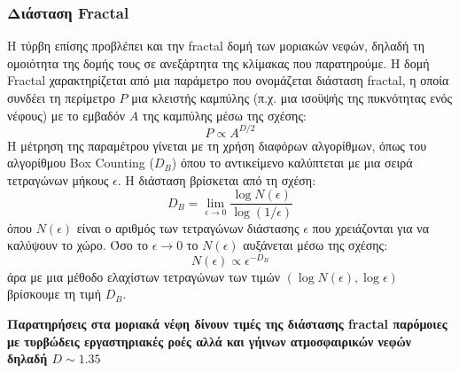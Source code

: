 \documentclass[a4paper,12pt]{memoir}
\begin{document}
\subsubsection{Διάσταση Fractal}
Η τύρβη επίσης προβλέπει και την fractal δομή των μοριακών νεφών, δηλαδή τη ομοιότητα της δομής τους σε ανεξάρτητα της κλίμακας που παρατηρούμε. 
Η δομή Fractal χαρακτηρίζεται από μια παράμετρο που ονομάζεται διάσταση fractal, η οποία συνδέει τη περίμετρο $P$ μια κλειστής καμπύλης (π.χ. μια ισοϋψής της πυκνότητας ενός νέφους) με το εμβαδόν $A$ της καμπύλης μέσω της σχέσης:
\begin{equation}
P\propto A^{D/2}
\end{equation}
Η μέτρηση της παραμέτρου γίνεται με τη χρήση διαφόρων αλγορίθμων, όπως του αλγορίθμου Box Counting ($D_B$) όπου το αντικείμενο καλύπτεται με μια σειρά τετραγώνων μήκους $\epsilon$. Η διάσταση βρίσκεται από τη σχέση:
\begin{equation}
D_B = \lim_{\epsilon \to 0} \frac{\log N(\epsilon)}{\log (1/\epsilon)}
\end{equation}
όπου $N(\epsilon)$ είναι ο αριθμός των τετραγώνων διάστασης $\epsilon$ που χρειάζονται για να καλύψουν το χώρο. Όσο το $\epsilon \to  0$ το $N(\epsilon)$ αυξάνεται μέσω της σχέσης:
\begin{equation}
N(\epsilon) \propto \epsilon ^{-D_B}
\end{equation}
άρα με μια μέθοδο ελαχίστων τετραγώνων των τιμών $\left(\log N(\epsilon),\log \epsilon\right)$ βρίσκουμε τη τιμή $D_B$.

\textbf{Παρατηρήσεις στα μοριακά νέφη δίνουν τιμές της διάστασης fractal παρόμοιες με τυρβώδεις εργαστηριακές ροές αλλά και γήινων ατμοσφαιρικών νεφών δηλαδή $D\sim 1.35$}
 
 
 
 
\end{document}
